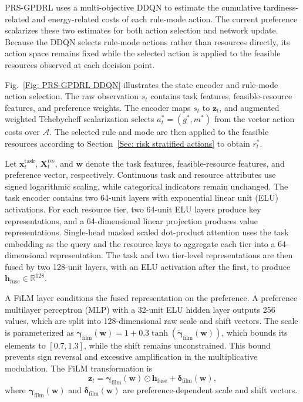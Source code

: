 \documentclass[10pt,journal]{IEEEtran}
\begin{document}
PRS-GPDRL uses a multi-objective DDQN \cite{vanhasselt2016} to estimate the cumulative tardiness-related and energy-related costs of each rule-mode action. The current preference scalarizes these two estimates for both action selection and network update. Because the DDQN selects rule-mode actions rather than resources directly, its action space remains fixed while the selected action is applied to the feasible resources observed at each decision point.

Fig.~\ref{Fig: PRS-GPDRL DDQN} illustrates the state encoder and rule-mode action selection. The raw observation $s_t$ contains task features, feasible-resource features, and preference weights. The encoder maps $s_t$ to $\mathbf{z}_t$, and augmented weighted Tchebycheff scalarization selects $a_t^*=(g^*,m^*)$ from the vector action costs over $\mathcal{A}$. The selected rule and mode are then applied to the feasible resources according to Section~\ref{Sec: risk stratified actions} to obtain $r_t^*$.


Let $\mathbf{x}_t^{\mathrm{task}}$, $\mathbf{X}_t^{\mathrm{res}}$, and $\mathbf{w}$ denote the task features, feasible-resource features, and preference vector, respectively. Continuous task and resource attributes use signed logarithmic scaling, while categorical indicators remain unchanged. The task encoder contains two 64-unit layers with exponential linear unit (ELU) activations. For each resource tier, two 64-unit ELU layers produce key representations, and a 64-dimensional linear projection produces value representations. Single-head masked scaled dot-product attention uses the task embedding as the query and the resource keys to aggregate each tier into a 64-dimensional representation. The task and two tier-level representations are then fused by two 128-unit layers, with an ELU activation after the first, to produce $\mathbf{h}_{\mathrm{fuse}}\in\mathbb{R}^{128}$.

A FiLM layer \cite{perez2018film} conditions the fused representation on the preference. A preference multilayer perceptron (MLP) with a 32-unit ELU hidden layer outputs 256 values, which are split into 128-dimensional raw scale and shift vectors. The scale is parameterized as
$\boldsymbol{\gamma}_{\mathrm{film}}(\mathbf{w})=
1+0.3\tanh(\widetilde{\boldsymbol{\gamma}}_{\mathrm{film}}(\mathbf{w}))$,
which bounds its elements to $[0.7,1.3]$, while the shift remains unconstrained. This bound prevents sign reversal and excessive amplification in the multiplicative modulation. The FiLM transformation is
\begin{equation}
    \mathbf{z}_t =
    \boldsymbol{\gamma}_{\mathrm{film}}(\mathbf{w})\odot
    \mathbf{h}_{\mathrm{fuse}}
    +\boldsymbol{\delta}_{\mathrm{film}}(\mathbf{w}),
    \label{Eq: film state embedding}
\end{equation}
where $\boldsymbol{\gamma}_{\mathrm{film}}(\mathbf{w})$ and
$\boldsymbol{\delta}_{\mathrm{film}}(\mathbf{w})$ are preference-dependent scale
and shift vectors.
\end{document}
